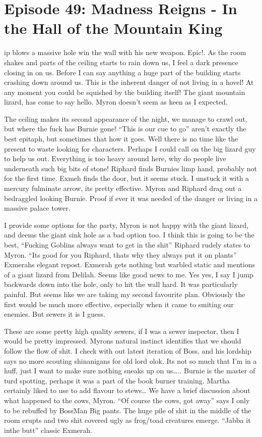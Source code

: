 \section{Episode 49: Madness Reigns - In the Hall of the Mountain King}

\medskip

ip blows a massive hole win the wall with his new weapon. Epic!. As the room shakes and parts of the ceiling starts to rain down us, I feel a dark presence closing in on us. Before I can say anything a huge part of the building starts crashing down around us. This is the inherent danger of not living in a hovel! At any moment you could be squished by the building itself! The giant mountain lizard, has come to say hello. Myron doesn’t seem as keen as I expected.\medskip

The ceiling makes its second appearance of the night, we manage to crawl out, but where the fuck has Burnie gone! “This is our cue to go” aren’t exactly the best epitaph, but sometimes that how it goes. Well there is no time like the present to waste looking for characters. Perhaps I could call on the big lizard guy to help us out. Everything is too heavy around here, why do people live underneath such big bits of stone! Riphard finds Burnies limp hand, probably not for the first time. Exmeh finds the door, but it seems stuck. I unstuck it with a mercury fulminate arrow, its pretty effective. Myron and Riphard drag out a bedraggled looking Burnie. Proof if ever it was needed of the danger or living in a massive palace tower.\medskip

I provide some options for the party, Myron is not happy with the giant lizard, and deems the giant sink hole as a bad option too. I think this is going to be the best, “Fucking Goblins always want to get in the shit” Riphard rudely states to Myron. “Its good for you Riphard, thats why they always put it on plants” Exmerahs elegant repost. Exmerah gets nothing but warbled static and mentions of a giant lizard from Delilah. Seems like good news to me. Yes yes, I say I jump backwards down into the hole, only to hit the wall hard. It was particularly painful. But seems like we are taking my second favourite plan. Obviously the first would be much more effective, especially when it came to smiting our enemies. But sewers it is I guess.\medskip

These are some pretty high quality sewers, if I was a sewer inspector, then I would be pretty impressed. Myrons natural instinct identifies that we should follow the flow of shit. I check with out latest iteration of Boss, and his lordship says no more scouting shinanigans for old lord olok. Its not so much that I’m in a huff, just I want to make sure nothing sneaks up on us….. Burnie is the master of turd spotting, perhaps it was a part of the book burner training. Martha certainly liked to use to add flavour to stews… We have a brief discussion about what happened to the cows, Myron. “Of course the cows, got away” says I only to be rebuffed by BossMan Big pants. The huge pile of shit in the middle of the room erupts and two shit covered ugly as frog/toad creatures emerge. “Jabba it inthe butt” classic Exmerah. \medskip

